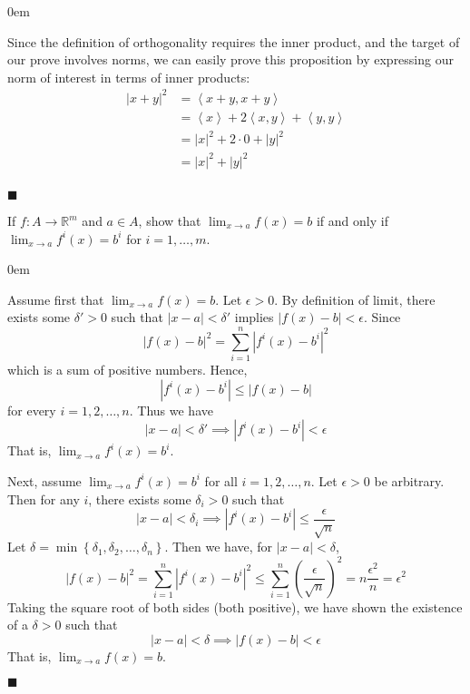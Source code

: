 \documentclass[12pt]{article}
\renewcommand{\qed}{\hfill$\blacksquare$}
\renewenvironment{proof}{\begin{addmargin}[1em]{0em}\begin{newproof}}{\end{newproof}\end{addmargin}\qed}
\newenvironment{problem}[2][Problem]{\begin{trivlist}
\item[\hskip \labelsep {\bfseries #1}\hskip \labelsep {\bfseries #2.}]}{\end{trivlist}}
\begin{document}
 
\begin{proof}
Since the definition of orthogonality requires the inner product, and the target of our prove involves norms, we can easily prove this proposition by expressing our norm of interest in terms of inner products:
\begin{equation*}
\begin{split}
\left| x+y\right|^2 & = \left\langle x+y, x+y \right\rangle \\
& = \left\langle x \right\rangle + 2\left\langle x,y \right\rangle + \left\langle y ,y \right\rangle \\ 
& = \left|x\right|^2 + 2\cdot 0 + \left|y\right|^2 \\
& = \left|x\right|^2 + \left| y \right|^2\\
\end{split}
\end{equation*}

\end{proof}
 
 
 
 
 
 
 
\begin{problem}{1.23}
If $f:A\rightarrow \mathbb{R}^m$ and $a\in A$, show that $\lim_{x\rightarrow a} f\left(x\right) = b$ if and only if $\lim_{x\rightarrow a} f^i\left(x\right) = b^i$ for $i=1,\ldots,m $.
\end{problem}
 
\begin{proof}
Assume first that $\lim_{x\rightarrow a} f\left(x\right) = b$.  Let $\epsilon > 0$. By definition of limit, there exists some $\delta' > 0$ such that $\left|x-a\right| < \delta '$ implies $\left|f\left(x\right) - b\right| < \epsilon $. Since 
$$ \left|f\left(x\right)-b\right|^2 = \sum_{i=1}^n \left| f^i\left(x\right) - b^i \right|^2 $$ which is a sum of positive numbers. Hence, 
$$ \left|f^i \left(x\right) -b^i \right| \leq \left|f\left(x\right)-b\right| $$ for every $i =1,2,\ldots,n$. Thus we have
$$ \left|x-a\right|< \delta ' \implies \left|f^i \left(x\right)-b^i\right| < \epsilon $$
That is, $\lim_{x\rightarrow a} f^i\left(x\right) = b^i $.

Next, assume $\lim_{x\rightarrow a} f^i\left(x\right)=b^i$ for all $i=1,2,\ldots,n$. Let $\epsilon >0$ be arbitrary. Then for any $i$, there exists some $\delta_i > 0$ such that $$ \left|x-a\right| < \delta_i \implies \left|f^i\left(x\right)-b^i\right| \leq \frac{\epsilon}{\sqrt{n}} $$ Let $\delta = \min\left\{\delta_1,\delta_2,\ldots,\delta_n\right\}$. Then we have, for $\left|x-a\right|<\delta$, 
$$ \left|f\left(x\right)-b\right|^2 = \sum_{i=1}^n \left|f^i\left(x\right)-b^i\right|^2 \leq \sum_{i=1}^n \left(\frac{\epsilon}{\sqrt{n}}\right)^2 = n \frac{\epsilon^2}{n} = \epsilon^2 $$ Taking the square root of both sides (both positive), we have shown the existence of a $\delta >0$ such that
$$ \left|x-a\right|< \delta \implies \left|f\left(x\right)-b\right| < \epsilon $$
That is, $\lim_{x\rightarrow a} f\left(x\right) = b$.

\end{proof}
 
\end{document}
